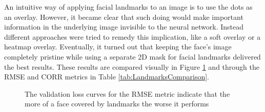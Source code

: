 An intuitive way of applying facial landmarks to an image is to use the dots as an overlay. However, it became clear that such doing would make important information in the underlying image invisible to the neural network. Instead different approaches were tried to remedy this implication, like a soft overlay or a heatmap overlay. Eventually, it turned out that keeping the face's image completely pristine while using a separate 2D mask for facial landmarks delivered the best results. These results are compared visually in Figure \ref{fig:LandmarksVisualComparison} and through the RMSE and CORR metrics in Table \ref{tab:LandmarksComparison}.

\begin{figure}[H]
  \begin{center}
  \hfill
  \hfill
  \hfill
  \caption[Ablation study: Landmark methods loss curves]{The validation loss curves for the RMSE metric indicate that the more of a face covered by landmarks the worse it performs}
  \label{fig:LandmarksVisualComparison}
  \end{center}
\end{figure}

